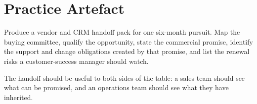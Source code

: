 \section{Practice Artefact}

Produce a vendor and CRM handoff pack for one six-month pursuit. Map the buying committee, qualify the opportunity, state the commercial promise, identify the support and change obligations created by that promise, and list the renewal risks a customer-success manager should watch.


The handoff should be useful to both sides of the table: a sales team should see what can be promised, and an operations team should see what they have inherited.
